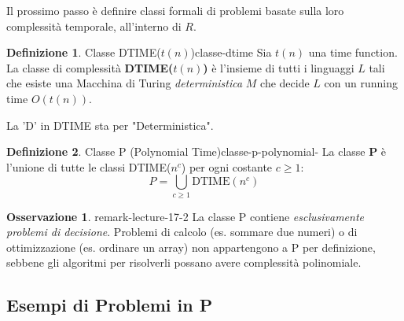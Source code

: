 \documentclass[a4paper]{article}
\theoremstyle{definition} %
\newtheorem{definition}{Definizione}[section]
\newtheorem{remark}[theorem]{Osservazione}
\begin{document}
Il prossimo passo è definire classi formali di problemi basate sulla loro complessità temporale, all'interno di $R$.

\begin{definition}{Classe DTIME($t(n)$)}{classe-dtime}
Sia $t(n)$ una time function. La classe di complessità \textbf{DTIME($t(n)$)} è l'insieme di tutti i linguaggi $L$ tali che esiste una Macchina di Turing \emph{deterministica} $M$ che decide $L$ con un running time $O(t(n))$.
\end{definition}
La 'D' in DTIME sta per "Deterministica".

\begin{definition}{Classe P (Polynomial Time)}{classe-p-polynomial-}
La classe \textbf{P} è l'unione di tutte le classi DTIME($n^c$) per ogni costante $c \ge 1$:
\[ P = \bigcup_{c \ge 1} \text{DTIME}(n^c) \]
\end{definition}

\begin{remark}{}{{ remark-lecture-17-2 }}
La classe P contiene \emph{esclusivamente problemi di decisione}. Problemi di calcolo (es. sommare due numeri) o di ottimizzazione (es. ordinare un array) non appartengono a P per definizione, sebbene gli algoritmi per risolverli possano avere complessità polinomiale.
\end{remark}

\subsection{Esempi di Problemi in P}
\end{document}
